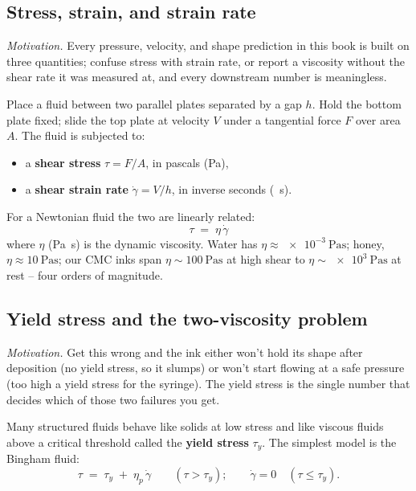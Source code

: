 \documentclass[11pt,a4paper]{article}
\newcommand{\gd}{\dot{\gamma}}
\begin{document}
\subsection{Stress, strain, and strain rate}

\emph{Motivation.} Every pressure, velocity, and shape prediction in this
book is built on three quantities; confuse stress with strain rate, or
report a viscosity without the shear rate it was measured at, and every
downstream number is meaningless.

Place a fluid between two parallel plates separated by a gap $h$. Hold
the bottom plate fixed; slide the top plate at velocity $V$ under a
tangential force $F$ over area $A$. The fluid is subjected to:

\begin{itemize}[leftmargin=1.6em,itemsep=2pt]
\item a \textbf{shear stress} $\tau = F/A$, in pascals (\si{\Pa}),
\item a \textbf{shear strain rate} $\gd = V/h$, in inverse seconds
(\si{\per\s}).
\end{itemize}

For a Newtonian fluid the two are linearly related:
\begin{equation}
\tau \;=\; \eta\,\gd
\label{eq:newton}
\end{equation}
where $\eta$ (\si{\Pa\s}) is the dynamic viscosity. Water has
$\eta\approx \SI{e-3}{\Pa\s}$; honey, $\eta\approx \SI{10}{\Pa\s}$;
our CMC inks span $\eta\sim\SI{100}{\Pa\s}$ at high shear to
$\eta\sim\SI{e3}{\Pa\s}$ at rest -- four orders of magnitude.

\subsection{Yield stress and the two-viscosity problem}

\emph{Motivation.} Get this wrong and the ink either won't hold its shape
after deposition (no yield stress, so it slumps) or won't start flowing at
a safe pressure (too high a yield stress for the syringe). The yield stress
is the single number that decides which of those two failures you get.

Many structured fluids behave like solids at low stress and like
viscous fluids above a critical threshold called the \textbf{yield
stress} $\tau_y$. The simplest model is the Bingham fluid:
\begin{equation}
\tau \;=\; \tau_y \;+\; \eta_p\,\gd \qquad (\tau > \tau_y);
\qquad \gd = 0 \quad (\tau \leq \tau_y).
\label{eq:bingham}
\end{equation}
\end{document}
